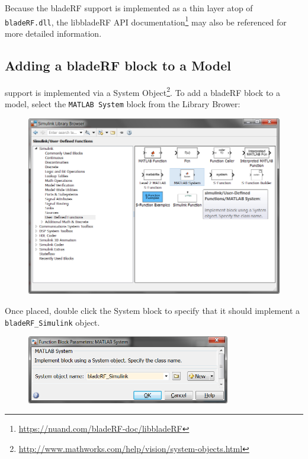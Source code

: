 {Because the bladeRF \matlab support is implemented as a thin layer atop of \texttt{bladeRF.dll}, the
libbladeRF API documentation\footnote{\url{https://nuand.com/bladeRF-doc/libbladeRF}} may also
be referenced for more detailed information.

\newpage
\subsection{Adding a bladeRF block to a \simulink Model}

\simulink support is implemented via a System Object\footnote{\url{http://www.mathworks.com/help/vision/system-objects.html}}.
To add a bladeRF block to a model, select the \texttt{MATLAB System} block from the Library Brower:

\begin{figure}[h]
  \centering
  \includegraphics[width=6in]{images/windows/simulink/browser.png}
\end{figure}

Once placed, double click the System block to specify that it should implement a \texttt{bladeRF\_Simulink} object.

\begin{figure}[h]
  \centering
  \includegraphics[width=3.5in]{images/windows/simulink/object.png}
\end{figure}

}
